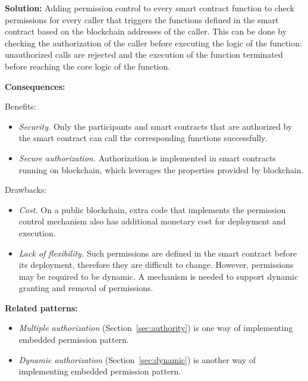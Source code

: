 \vspace{0.5em}\noindent \textbf{Solution:} 
Adding permission control to every smart contract function to check permissions for every caller that triggers the functions defined in the smart contract based on the blockchain addresses of the caller. This can be done by checking the authorization of the caller before executing the logic of the function: unauthorized calls are rejected and the execution of the function terminated before reaching the core logic of the function. 

\vspace{0.5em}\noindent \textbf{Consequences:} 

Benefits:
\begin{itemize}
  \item \textit{Security.} Only the participants and smart contracts that are authorized by the smart contract can call the corresponding functions successfully.
  \item \textit{Secure authorization.} Authorization is implemented in smart contracts running on blockchain, which leverages the properties provided by blockchain. 
\end{itemize}

Drawbacks: 
\begin{itemize}
   \item \textit{Cost.} On a public blockchain, extra code that implements the permission control mechanism also has additional monetary cost for deployment and execution.
    \item \textit{Lack of flexibility.} Such permissions are defined in the smart contract before its deployment, therefore they are difficult to change. However, permissions may be required to be dynamic. A mechanism is needed to support dynamic granting and removal of permissions.
\end{itemize}


\vspace{0.5em}\noindent \textbf{Related patterns:}
\begin{itemize}
    \item \textit{Multiple authorization} (Section~\ref{sec:authority}) is one way of implementing embedded permission pattern.
    \item \textit{Dynamic authorization} (Section~\ref{sec:dynamic}) is another way of implementing embedded permission pattern.
\end{itemize}


